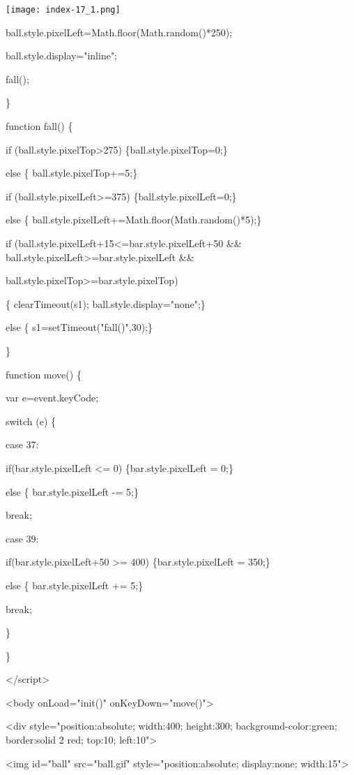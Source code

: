 \documentclass[
]{article}
\begin{document}
\protect\hypertarget{index_split_002.htmlux5cux23p17}{}{}\texttt{[image: index-17\_1.png]}

ball.style.pixelLeft=Math.floor(Math.random()*250);

ball.style.display="inline";

fall();

\}

function fall() \{

if (ball.style.pixelTop\textgreater275) \{ball.style.pixelTop=0;\}

else \{ ball.style.pixelTop+=5;\}

if (ball.style.pixelLeft\textgreater=375) \{ball.style.pixelLeft=0;\}

else \{ ball.style.pixelLeft+=Math.floor(Math.random()*5);\}

if (ball.style.pixelLeft+15\textless=bar.style.pixelLeft+50 \&\&
ball.style.pixelLeft\textgreater=bar.style.pixelLeft \&\&

ball.style.pixelTop\textgreater=bar.style.pixelTop)

\{ clearTimeout(s1); ball.style.display="none";\}

else \{ s1=setTimeout("fall()",30);\}

\}

function move() \{

var e=event.keyCode;

switch (e) \{

case 37:

if(bar.style.pixelLeft \textless= 0) \{bar.style.pixelLeft = 0;\}

else \{ bar.style.pixelLeft -= 5;\}

break;

case 39:

if(bar.style.pixelLeft+50 \textgreater= 400) \{bar.style.pixelLeft =
350;\}

else \{ bar.style.pixelLeft += 5;\}

break;

\}

\}

\textless/script\textgreater{}

\textless body onLoad="init()" onKeyDown="move()"\textgreater{}

\textless div style="position:absolute; width:400; height:300;
background-color:green; border:solid 2 red; top:10;
left:10"\textgreater{}

\textless img id="ball" src="ball.gif" style="position:absolute;
display:none; width:15"\textgreater{}
\end{document}

